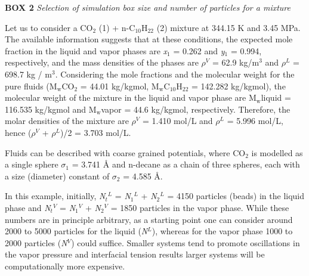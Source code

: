 \documentclass{scrbook}
\begin{document}
\textbf{BOX 2} \textit{Selection of simulation box size and number of particles for a mixture}

Let us to consider a CO$_{2}$ (1) + n-C$_{10}$H$_{22}$ (2) mixture at 344.15
K and 3.45 MPa. The available information\citep{shaver2001} suggests that at these
conditions, the expected mole fraction in the liquid and vapor phases are
\textit{x}$_{1}$ = 0.262 and \textit{y}$_{1}$ = 0.994, respectively, and the
mass densities of the phases are ${\rho}$$^{V}$ = 62.9 kg/m$^{3}$ and
${\rho}$$^{L}$ = 698.7 kg / m$^{3}$. Considering the mole fractions and the
molecular weight for the pure fluids (M$_{\mathrm{w}}$CO$_{2}$ = 44.01
kg/kgmol, M$_{\mathrm{w}}$C$_{10}$H$_{22}$ = 142.282 kg/kgmol), the molecular
weight of the mixture in the liquid and vapor phase are M$_{\mathrm{w}}$liquid
= 116.535 kg/kgmol and M$_{\mathrm{w}}$vapor = 44.6 kg/kgmol, respectively.
Therefore, the molar densities of the mixture are  ${\rho}$$^{V}$ = 1.410 mol/L
and ${\rho}$$^{L}$ = 5.996 mol/L, hence (${\rho}$$^{V}$ + ${\rho}$$^{L}$)/2
= 3.703 mol/L.

Fluids can be described with coarse grained potentials, where CO$_{2}$ is
modelled as a single sphere ${\sigma}$$_{1}$ = 3.741 \AA{}\citep{mejia2014a}
 and n-decane as
a chain of three spheres, each with a size (diameter) constant of
${\sigma}$$_{2}$ = 4.585 \AA{}\citep{mejia2014b}. 

In this example, initially, \textit{N}$_{t}$$^{L}$ = \textit{N}$_{1}$$^{L}$
+ \textit{N}$_{2}$$^{L}$ = 4150 particles (beads) in the liquid phase and
\textit{N}$_{t}$$^{V}$ = \textit{N}$_{1}$$^{V}$ + \textit{N}$_{2}$$^{V}$ = 1850
particles in the vapor phase. While these numbers are in principle arbitrary,
as a starting point one can consider around 2000 to 5000 particles for the
liquid (\textit{N}$^{L}$), whereas for the vapor phase 1000 to 2000 particles
(\textit{N}$^{V}$) could suffice. Smaller systems tend to promote oscillations
in the vapor pressure and interfacial tension results \citep{gonzalez2005,orea2005,janecek2009}
larger systems will be computationally more expensive.
\end{document}
